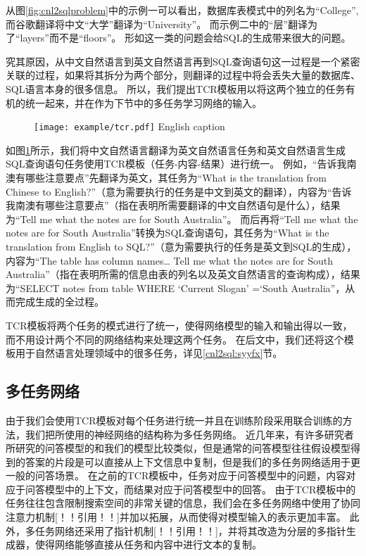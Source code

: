 从图\ref{fig:cnl2sqlproblem}中的示例一可以看出，数据库表模式中的列名为“College”,而谷歌翻译将中文“大学”翻译为“University”。
而示例二中的“层”翻译为了“layers”而不是“floors”。
形如这一类的问题会给SQL的生成带来很大的问题。

究其原因，从中文自然语言到英文自然语言再到SQL查询语句这一过程是一个紧密关联的过程，如果将其拆分为两个部分，则翻译的过程中将会丢失大量的数据库、SQL语言本身的很多信息。
所以，我们提出TCR模板用以将这两个独立的任务有机的统一起来，并在作为下节中的多任务学习网络的输入。

\begin{figure}[!htp]
    \centering
    \texttt{[image: example/tcr.pdf]}
      {English caption}
    \label{fig:cnl2sqltcr}
  \end{figure}

如图\ref{fig:cnl2sqltcr}所示，我们将中文自然语言翻译为英文自然语言任务和英文自然语言生成SQL查询语句任务使用TCR模板（任务-内容-结果）进行统一。
例如，“告诉我南澳有哪些注意要点”先翻译为英文，其任务为“What is the translation from Chinese to English?”（意为需要执行的任务是中文到英文的翻译），内容为“告诉我南澳有哪些注意要点”（指在表明所需要翻译的中文自然语句是什么），结果为“Tell me what the notes are for South Australia”。
而后再将“Tell me what the notes are for South Australia”转换为SQL查询语句，其任务为“What is the translation from English to SQL?”（意为需要执行的任务是英文到SQL的生成），内容为“The table has column names… Tell me what the notes are for South Australia”（指在表明所需的信息由表的列名以及英文自然语言的查询构成），结果为“SELECT notes from table WHERE ‘Current Slogan’ =‘South Australia”，从而完成生成的全过程。

TCR模板将两个任务的模式进行了统一，使得网络模型的输入和输出得以一致，而不用设计两个不同的网络结构来处理这两个任务。
在后文中，我们还将这个模板用于自然语言处理领域中的很多任务，详见\ref{cnl2sql:syyfx}节。

\subsection{多任务网络}

由于我们会使用TCR模板对每个任务进行统一并且在训练阶段采用联合训练的方法，我们把所使用的神经网络的结构称为多任务网络。
近几年来，有许多研究者所研究的问答模型的和我们的模型比较类似，但是通常的问答模型往往假设模型得到的答案的片段是可以直接从上下文信息中复制，但是我们的多任务网络适用于更一般的问答场景。
在之前的TCR模板中，任务对应于问答模型中的问题，内容对应于问答模型中的上下文，而结果对应于问答模型中的回答。
由于TCR模板中的任务往往包含限制搜索空间的非常关键的信息，我们会在多任务网络中使用了协同注意力机制[！！引用！！]并加以拓展，从而使得对模型输入的表示更加丰富。
此外，多任务网络还采用了指针机制[！！引用！！]，并将其改造为分层的多指针生成器，使得网络能够直接从任务和内容中进行文本的复制。

